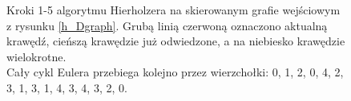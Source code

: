 \documentclass[a4paper, 12pt, twoside, openright]{article}
\begin{document}
\begin{figure}[!p]
   	\caption[]{Kroki 1-5 algorytmu Hierholzera na skierowanym grafie wejściowym z rysunku \ref{h_Dgraph}. Grubą linią czerwoną oznaczono aktualną krawędź, cieńszą krawędzie już odwiedzone, a na niebiesko krawędzie wielokrotne. \\Cały cykl Eulera przebiega kolejno przez wierzchołki: 0, 1, 2, 0, 4, 2, 3, 1, 3, 1, 4, 3, 4, 3, 2, 0.}
   	\label{imgHierAlgoEgz3}
   \end{figure}	

   \captionsetup{justification=centering}
   \begin{figure}[p]
   	\centering
   	\quad
   	\quad
   	\quad

\end{figure}
\end{document}
